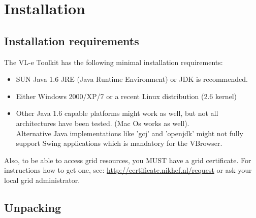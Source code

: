 %
%


\chapter{Installation}
\label{chap:vlet_installation}

\section{Installation requirements}

The VL-e Toolkit has the following minimal installation requirements:
\begin{itemize}  
   \item SUN Java 1.6 JRE (Java Runtime Environment) or JDK is recommended.   
   \item Either Windows 2000/XP/7 or a recent Linux distribution (2.6 kernel)
   \item Other Java 1.6 capable platforms might work as well, but not all
   architectures have been tested. (Mac Os works as well).\\
   Alternative Java implementations like 'gcj'  and 'openjdk' might not fully
   support Swing applications which is mandatory for the VBrowser. 
 \end{itemize} 

Also, to be able to access grid resources, you MUST have a grid certificate. 
For instructions how to get one, see:
\url{http://certificate.nikhef.nl/request} or ask your local grid administrator. 

\section{Unpacking}

